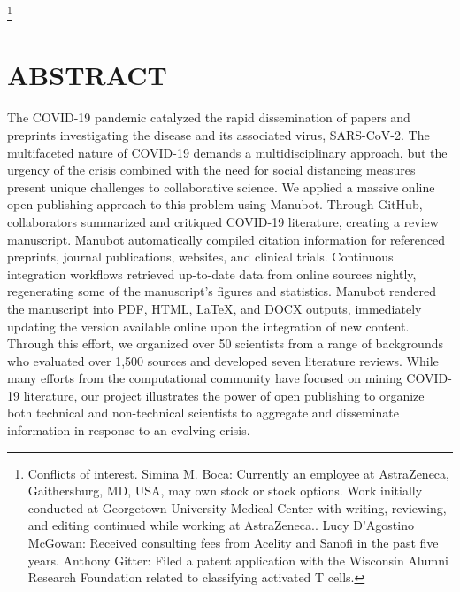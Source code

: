 \documentclass[twocolumn]{ceurart}
\begin{document}


\maketitle

{\let\thefootnote\relax\footnote{Conflicts of interest. Simina M. Boca: Currently an employee at AstraZeneca, Gaithersburg, MD, USA, may own stock or stock options. Work initially conducted at Georgetown University Medical Center with writing, reviewing, and editing continued while working at AstraZeneca.. Lucy D'Agostino McGowan: Received consulting fees from Acelity and Sanofi in the past five years. Anthony Gitter: Filed a patent application with the Wisconsin Alumni Research Foundation related to classifying activated T cells.}}

\hypertarget{abstract}{%
\section{ABSTRACT}\label{abstract}}

The COVID-19 pandemic catalyzed the rapid dissemination of papers and preprints investigating the disease and its associated virus, SARS-CoV-2.
The multifaceted nature of COVID-19 demands a multidisciplinary approach, but the urgency of the crisis combined with the need for social distancing measures present unique challenges to collaborative science.
We applied a massive online open publishing approach to this problem using Manubot.
Through GitHub, collaborators summarized and critiqued COVID-19 literature, creating a review manuscript.
Manubot automatically compiled citation information for referenced preprints, journal publications, websites, and clinical trials.
Continuous integration workflows retrieved up-to-date data from online sources nightly, regenerating some of the manuscript's figures and statistics.
Manubot rendered the manuscript into PDF, HTML, LaTeX, and DOCX outputs, immediately updating the version available online upon the integration of new content.
Through this effort, we organized over 50 scientists from a range of backgrounds who evaluated over 1,500 sources and developed seven literature reviews.
While many efforts from the computational community have focused on mining COVID-19 literature, our project illustrates the power of open publishing to organize both technical and non-technical scientists to aggregate and disseminate information in response to an evolving crisis.
\end{document}
